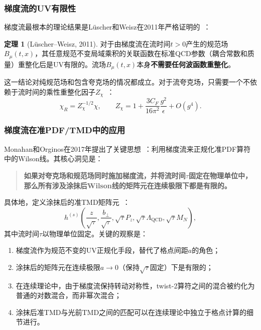 \documentclass[12pt,a4paper]{ctexart}
\theoremstyle{definition}
\newtheorem{theorem}{定理}[section]
\newcommand{\Pz}{P_z}
\newcommand{\QCD}{\Lambda_{\text{QCD}}}
\newcommand{\bperp}{b_\perp}
\begin{document}
\subsubsection{梯度流的UV有限性}

梯度流最根本的理论结果是L\"uscher和Weisz在2011年严格证明的~\cite{LuscherWeisz2011}：

\begin{theorem}[L\"uscher--Weisz, 2011]
对于由梯度流在流时间$t>0$产生的规范场$B_\mu(t,x)$，其任意规范不变局域乘积的关联函数在标准QCD参数（耦合常数和质量）重整化后是UV有限的。流场$B_\mu(t,x)$本身\textbf{不需要任何波函数重整化}。
\end{theorem}

这一结论对纯规范场和包含夸克场的情况都成立。对于流夸克场，只需要一个不依赖于流时间的乘性重整化因子$Z_\chi$~\cite{Luscher2013}：
\begin{equation}\label{eq:chi_renorm}
    \chi_R = Z_\chi^{-1/2} \chi, \qquad Z_\chi = 1 + \frac{3C_F}{16\pi^2} \frac{g^2}{\epsilon} + O(g^4).
\end{equation}

\subsubsection{梯度流在准PDF/TMD中的应用}

Monahan和Orginos在2017年提出了关键思想~\cite{MonahanOrginos2017}：利用梯度流来正规化准PDF算符中的Wilson线。其核心洞见是：

\begin{quote}
\textbf{如果对夸克场和规范场同时施加梯度流，并将流时间$\tau$固定在物理单位中，那么所有涉及涂抹后Wilson线的矩阵元在连续极限下都是有限的。}
\end{quote}

具体地，定义涂抹后的准TMD矩阵元~\cite{Monahan2018}：
\begin{equation}\label{eq:smeared_quasi}
    h^{(s)}\!\left( \frac{z}{\sqrt{\tau}}, \frac{\bperp}{\sqrt{\tau}}, \sqrt{\tau}\Pz, \sqrt{\tau}\QCD, \sqrt{\tau}M_N \right),
\end{equation}
其中流时间$\tau$以物理单位固定。关键的观察是：
\begin{enumerate}
    \item 梯度流作为规范不变的UV正规化手段，替代了格点间距$a$的角色；
    \item 涂抹后的矩阵元在连续极限$a \to 0$（保持$\sqrt{\tau}$固定）下是有限的；
    \item 在连续理论中，由于梯度流保持转动对称性，twist-2算符之间的混合被约化为普通的对数混合，而非幂次混合；
    \item 涂抹后准TMD与光前TMD之间的匹配可以在连续理论中独立于格点计算的细节进行。
\end{enumerate}
\end{document}
